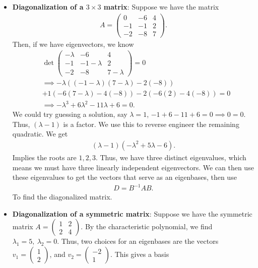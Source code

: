 \documentclass{report}
\begin{document}
\begin{itemize}
        \item \textbf{Diagonalization of a $3\times 3$ matrix}: Suppose we have the matrix
            \begin{align*}
                A = \begin{pmatrix} 0 & -6 & 4 \\ -1 & -1 & 2 \\ -2 & -8 & 7 \end{pmatrix}
            .\end{align*}
            Then, if we have eigenvectors, we know
            \begin{align*}
                &\det{\begin{pmatrix}-\lambda & -6 & 4 \\ -1 & -1 - \lambda & 2 \\ -2 & -8 & 7-\lambda\end{pmatrix}} = 0 \\
                &\implies -\lambda ((-1-\lambda)(7-\lambda) - 2(-8))  \\
                &+ 1(-6(7-\lambda) - 4(-8)) -2 (-6(2) - 4(-8)) = 0 \\
                &\implies -\lambda^{3} + 6 \lambda^{2} - 11\lambda + 6 = 0
            .\end{align*}
            We could try guessing a solution, say $\lambda= 1$, $-1 + 6 -11 + 6 = 0 \implies 0 = 0$. Thus, $(\lambda-1)$ is a factor. We use this to reverse engineer the remaining quadratic. We get
            \begin{align*}
                (\lambda - 1)(-\lambda^{2}+5\lambda -6) 
            .\end{align*}
            Implies the roots are $1,2,3$. Thus, we have three distinct eigenvalues, which means we must have three linearly independent eigenvectors. We can then use these eigenvalues to get the vectors that serve as an eigenbases, then use
            \begin{align*}
                D = B^{-1}AB
            .\end{align*}
            To find the diagonalized matrix.
        \item \textbf{Diagonalization of a symmetric matrix}: Suppose we have the symmetric matrix $ A =\begin{pmatrix} 1 & 2 \\ 2 & 4  \end{pmatrix} $. By the characteristic polynomial, we find $\lambda_{1} = 5, \ \lambda_{2} = 0$. Thus, two choices for an eigenbases are the vectors $v_{1} = \begin{pmatrix}  1 \\ 2 \end{pmatrix}$, and $v_{2} = \begin{pmatrix} -2 \\ 1 \end{pmatrix} $. This gives a basis 

\end{itemize}
\end{document}
